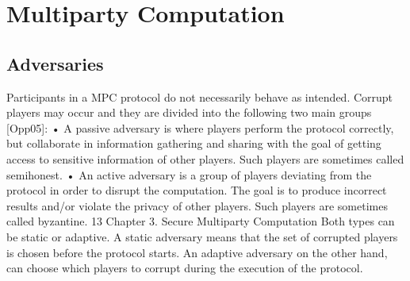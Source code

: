 \section{Multiparty Computation}
\subsection{Adversaries}
Participants in a MPC protocol do not necessarily behave as intended. Corrupt
players may occur and they are divided into the following two main
groups [Opp05]:
• A passive adversary is where players perform the protocol correctly,
but collaborate in information gathering and sharing with the goal of
getting access to sensitive information of other players. Such players
are sometimes called semihonest.
• An active adversary is a group of players deviating from the protocol
in order to disrupt the computation. The goal is to produce incorrect
results and/or violate the privacy of other players. Such players are
sometimes called byzantine.
13
Chapter 3. Secure Multiparty Computation
Both types can be static or adaptive. A static adversary means that the
set of corrupted players is chosen before the protocol starts. An adaptive
adversary on the other hand, can choose which players to corrupt during
the execution of the protocol.